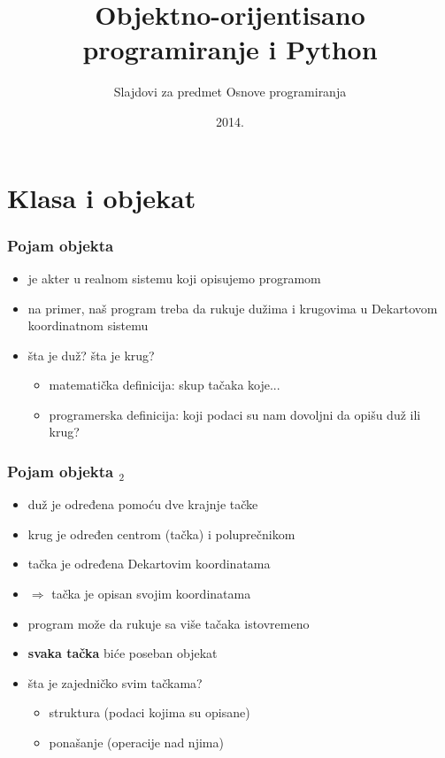 \documentclass[utf8,compress]{beamer}
\title{Objektno-orijentisano programiranje i Python}
\subtitle{\tiny{Slajdovi za predmet Osnove programiranja}}
\institute{Katedra za informatiku, Fakultet tehničkih nauka, Novi Sad}
\date{2014.}
\begin{document}
\expandafter\def\csname PY@tok@err\endcsname{}

\frame{\titlepage}


\section[Klasa i objekat]{Klasa i objekat}

\begin{frame}[fragile]
  \frametitle{Pojam objekta}
  \begin{itemize}
    \item {} je akter u realnom sistemu koji opisujemo programom
    \item na primer, naš program treba da rukuje dužima i krugovima u Dekartovom koordinatnom sistemu
    \item šta je duž? šta je krug?
    \begin{itemize}
      \item matematička definicija: skup tačaka koje...
      \item programerska definicija: koji podaci su nam dovoljni da opišu duž ili krug?
    \end{itemize}
  \end{itemize}
\end{frame}

\begin{frame}[fragile]
  \frametitle{Pojam objekta $_2$}
  \begin{itemize}
    \item duž je određena pomoću dve krajnje tačke
    \item krug je određen centrom (tačka) i poluprečnikom
    \item tačka je određena Dekartovim koordinatama
    \item $\Rightarrow$ tačka je  opisan svojim koordinatama
    \item program može da rukuje sa više tačaka istovremeno
    \item \textbf{svaka tačka} biće poseban objekat
    \item šta je zajedničko svim tačkama?
    \begin{itemize}
      \item struktura (podaci kojima su opisane)
      \item ponašanje (operacije nad njima) 
    \end{itemize}
  \end{itemize}
\end{frame}
\end{document}
